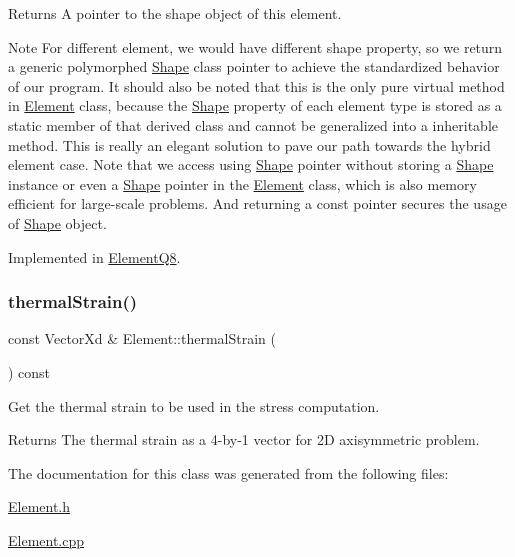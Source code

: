 \begin{DoxyReturn}{Returns}
A pointer to the shape object of this element.
\end{DoxyReturn}
\begin{DoxyNote}{Note}
For different element, we would have different shape property, so we return a generic polymorphed \mbox{\hyperlink{class_shape}{Shape}} class pointer to achieve the standardized behavior of our program. It should also be noted that this is the only pure virtual method in \mbox{\hyperlink{class_element}{Element}} class, because the \mbox{\hyperlink{class_shape}{Shape}} property of each element type is stored as a static member of that derived class and cannot be generalized into a inheritable method. This is really an elegant solution to pave our path towards the hybrid element case. Note that we access using \mbox{\hyperlink{class_shape}{Shape}} pointer without storing a \mbox{\hyperlink{class_shape}{Shape}} instance or even a \mbox{\hyperlink{class_shape}{Shape}} pointer in the \mbox{\hyperlink{class_element}{Element}} class, which is also memory efficient for large-\/scale problems. And returning a const pointer secures the usage of \mbox{\hyperlink{class_shape}{Shape}} object. 
\end{DoxyNote}


Implemented in \mbox{\hyperlink{class_element_q8_a1d2c3824da803df5eb9cdd36acf48874}{Element\+Q8}}.

\mbox{\label{class_element_ae7d89bab030841799347a94856496f79}} 
\subsubsection{\texorpdfstring{thermal\+Strain()}{thermalStrain()}}
{\footnotesize\ttfamily const Vector\+Xd \& Element\+::thermal\+Strain (\begin{DoxyParamCaption}{ }\end{DoxyParamCaption}) const}



Get the thermal strain to be used in the stress computation. 

\begin{DoxyReturn}{Returns}
The thermal strain as a 4-\/by-\/1 vector for 2D axisymmetric problem. 
\end{DoxyReturn}


The documentation for this class was generated from the following files\+:\begin{DoxyCompactItemize}
\item 
\mbox{\hyperlink{_element_8h}{Element.\+h}}\item 
\mbox{\hyperlink{_element_8cpp}{Element.\+cpp}}\end{DoxyCompactItemize}
